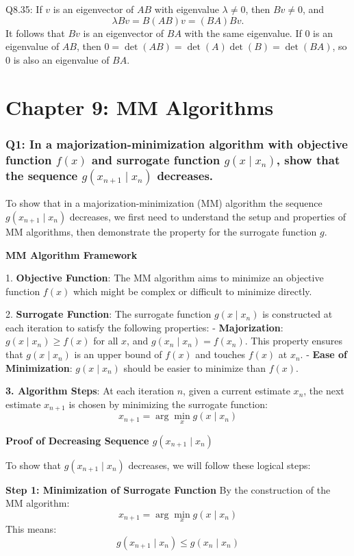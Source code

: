 \documentclass[8pt]{article}
\begin{document}
{Q8.35: If \(v\) is an eigenvector of \(AB\) with eigenvalue \(\lambda \neq 0\), then \(Bv \neq 0\), and
\[
\lambda Bv = B(AB)v = (BA)Bv.
\]
It follows that \(Bv\) is an eigenvector of \(BA\) with the same eigenvalue. If \(0\) is an eigenvalue of \(AB\), then \(0 = \det(AB) = \det(A)\det(B) = \det(BA)\), so \(0\) is also an eigenvalue of \(BA\).

\newpage
\section*{Chapter 9: MM Algorithms}
\subsubsection*{Q1: In a majorization-minimization algorithm with objective function \(f(x)\) and surrogate function \(g(x \mid x_n)\), show that the sequence \(g(x_{n+1} \mid x_n)\) decreases.}

To show that in a majorization-minimization (MM) algorithm the sequence \(g(x_{n+1} \mid x_n)\) decreases, we first need to understand the setup and properties of MM algorithms, then demonstrate the property for the surrogate function \(g\).

\textbf{MM Algorithm Framework}

1. \textbf{Objective Function}:
   The MM algorithm aims to minimize an objective function \(f(x)\) which might be complex or difficult to minimize directly.

2. \textbf{Surrogate Function}:
   The surrogate function \(g(x \mid x_n)\) is constructed at each iteration to satisfy the following properties:
   - \textbf{Majorization}: \(g(x \mid x_n) \geq f(x)\) for all \(x\), and \(g(x_n \mid x_n) = f(x_n)\). This property ensures that \(g(x \mid x_n)\) is an upper bound of \(f(x)\) and touches \(f(x)\) at \(x_n\).
   - \textbf{Ease of Minimization}: \(g(x \mid x_n)\) should be easier to minimize than \(f(x)\).

\textbf{3. Algorithm Steps}:
   At each iteration \(n\), given a current estimate \(x_n\), the next estimate \(x_{n+1}\) is chosen by minimizing the surrogate function:
   \[
   x_{n+1} = \arg \min_x g(x \mid x_n)
   \]

\textbf{Proof of Decreasing Sequence \(g(x_{n+1} \mid x_n)\)}

To show that \(g(x_{n+1} \mid x_n)\) decreases, we will follow these logical steps:

\textbf{Step 1: Minimization of Surrogate Function}
By the construction of the MM algorithm:
\[
x_{n+1} = \arg \min_x g(x \mid x_n)
\]
This means:
\[
g(x_{n+1} \mid x_n) \leq g(x_n \mid x_n)
\]

}
\end{document}

